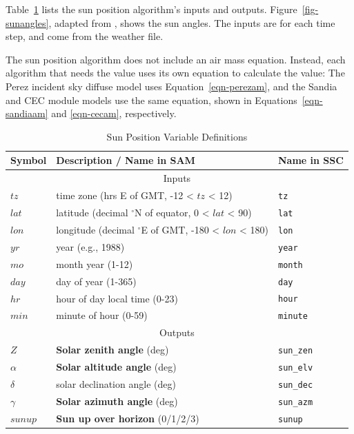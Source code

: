 \documentclass[12pt,letterpaper]{article}
\begin{document}
Table~\ref{tab-sunposvars} lists the sun position algorithm's inputs and outputs. Figure~\ref{fig-sunangles}, adapted from \citet{dunlap2007}, shows the sun angles. The inputs are for each time step, and come from the weather file. 

The sun position algorithm does not include an air mass equation. Instead, each algorithm that needs the value uses its own equation to calculate the value: The Perez incident sky diffuse model uses Equation~\ref{eqn-perezam}, and the Sandia and CEC module models use the same equation, shown in Equations~\ref{eqn-sandiaam} and \ref{eqn-cecam}, respectively. 

\begin{table}
\begin{center}
\caption{Sun Position Variable Definitions}
\begin{tabular}{lll}
\midrule
Symbol & Description / \textbf{Name in SAM} & Name in SSC\\
\midrule
\multicolumn{3}{c}{Inputs}\\
$\mathit{tz}$ & time zone (hrs E of GMT, -12 < $tz$ < 12) & \texttt{tz}\\
$\mathit{lat}$ & latitude (decimal $^\circ$N of equator, 0 < $lat$ < 90) & \texttt{lat}\\
$\mathit{lon}$ & longitude (decimal $^\circ$E of GMT, -180 < $lon$ < 180) & \texttt{lon}\\
$\mathit{yr}$ & year (e.g., 1988) & \texttt{year}\\
$\mathit{mo}$ & month year (1-12) & \texttt{month}\\
$\mathit{day}$ & day of year (1-365) & \texttt{day}\\
$\mathit{hr}$ & hour of day local time (0-23) & \texttt{hour}\\
$\mathit{min}$ & minute of hour (0-59) & \texttt{minute}\\
\midrule
\multicolumn{3}{c}{Outputs}\\
$Z$ & \textbf{Solar zenith angle} (deg) & \texttt{sun\_zen}\\
$\alpha$ & \textbf{Solar altitude angle} (deg) & \texttt{sun\_elv}\\
$\delta$ & solar declination angle (deg) & \texttt{sun\_dec}\\
$\gamma$ & \textbf{Solar azimuth angle} (deg) & \texttt{sun\_azm}\\
$\mathit{sunup}$ & \textbf{Sun up over horizon}  (0/1/2/3)& \texttt{sunup}\\
\midrule
\end{tabular}
\label{tab-sunposvars}
\end{center}
\end{table}
\end{document}
